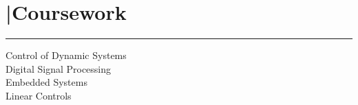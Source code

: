 \section{\textcolor{gold}{\faInstitution}|Coursework}
\noindent\color{blue}\rule{5.5cm}{0.4pt}
Control of Dynamic Systems\\
Digital Signal Processing \\
Embedded Systems\\
Linear Controls
\sectionsep